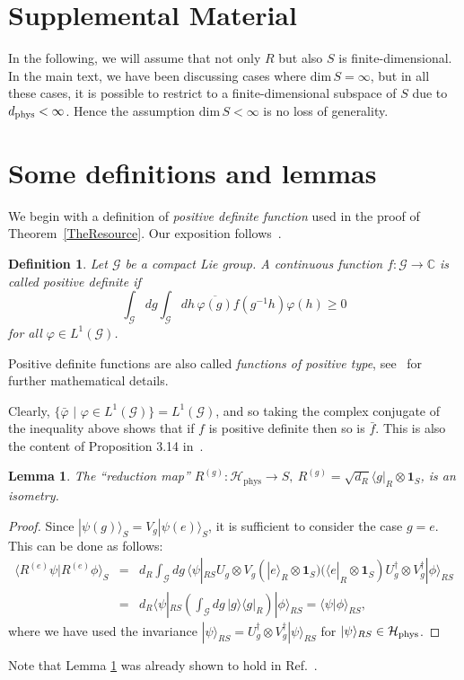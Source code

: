 \documentclass[aps,10pt,twocolumn,showpacs,pra,citeautoscript,amsmath,amssymb,floatfix,superscriptaddress]{revtex4-1}
\newtheorem{lemma}{Lemma}
\newtheorem{definition}{Definition}
\def\dim{{\mathrm{dim}}}
\def\phys{{\mathrm{phys}}}
\newcommand{\ch}{\mathcal H}
\newcommand{\bra}[1]{\langle #1|}
\newcommand{\bracket}[2]{\langle #1|#2\rangle}
\begin{document}
\onecolumngrid

\section*{Supplemental Material}
In the following, we will assume that not only $R$ but also $S$ is finite-dimensional. In the main text, we have been discussing cases where $\dim\, S=\infty$, but in all these cases, it is possible to restrict to a finite-dimensional subspace of $S$ due to $d_{\rm phys}<\infty$. Hence the assumption $\dim\, S<\infty$ is no loss of generality.

\section{Some definitions and lemmas}
\label{SecSomeLemmas}
We begin with a definition of \emph{positive definite function} used in the proof of Theorem~\ref{TheResource}. Our exposition follows~\cite{Marvian}.
\begin{definition}
Let $\mathcal{G}$ be a compact Lie group. A continuous function $f:\mathcal{G}\to\mathbb{C}$ is called \emph{positive definite} if
\[
   \int_{\mathcal{G}}dg\int_{\mathcal{G}} dh\, \overline{\varphi(g)}f(g^{-1}h)\varphi(h)\geq 0
\]
for all $\varphi\in L^1(\mathcal{G})$.
\end{definition}
Positive definite functions are also called \emph{functions of positive type}, see~\cite[Sec.\ 3.3]{Folland} for further mathematical details.

Clearly, $\{\bar\varphi\,\,|\,\,\varphi\in L^1(\mathcal{G})\}=L^1(\mathcal{G})$, and so taking the complex conjugate of the inequality above shows that if $f$ is positive definite then so is $\bar f$. This is also the content of Proposition 3.14 in~\cite{Folland}.

\begin{lemma}
\label{LemNormalized}
The \enquote{reduction map} $R^{(g)}: \ch_\phys \to S,\  R^{(g)}= \sqrt{d_R}\bra{g}_R \otimes \mathbf{1}_S$, is an isometry.
\end{lemma}
\begin{proof}
Since $|\psi(g)\rangle_S=V_g |\psi(e)\rangle_S$, it is sufficient to consider the case $g=e$. This can be done as follows:
\begin{eqnarray*}
   \langle R^{(e)}\psi|R^{(e)}\phi\rangle_S&=&d_R \int_{\mathcal{G}}dg\, \langle\psi|_{RS} U_g\otimes V_g (|e\rangle_R\otimes\mathbf{1}_S)(\langle e|_R\otimes\mathbf{1}_S)U_g^\dagger\otimes V_g^\dagger |\phi\rangle_{RS}\\
   &=&d_R \langle\psi|_{RS}\left(\int_{\mathcal{G}} dg\,|g\rangle\langle g|_R\right) |\phi\rangle_{RS}=\bracket{\psi}{\phi}_{RS},
\end{eqnarray*}
where we have used the invariance $|\psi\rangle_{RS}=U_g^\dagger\otimes V_g^\dagger |\psi\rangle_{RS}$ for $|\psi\rangle_{RS}\in\mathcal{H}_{\rm phys}$.
\end{proof}
Note that Lemma \ref{LemNormalized} was already shown to hold in Ref.~\cite{DGHLM21}.
\end{document}
